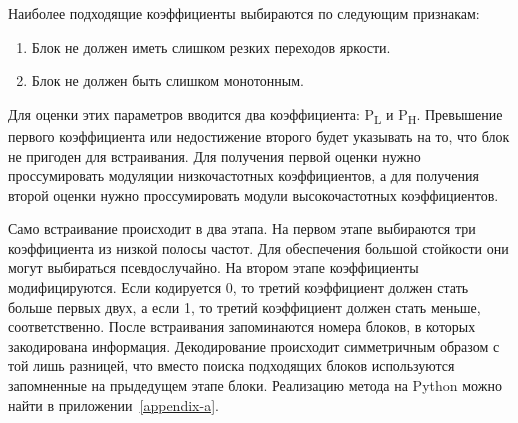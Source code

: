 Наиболее подходящие коэффициенты выбираются по следующим признакам:
\begin{enumerate}
    \item Блок не должен иметь слишком резких переходов яркости.
    \item Блок не должен быть слишком монотонным.
\end{enumerate}
Для оценки этих параметров вводится два коэффициента: P\textsubscript{L} и P\textsubscript{H}.
Превышение первого коэффициента или недостижение второго будет указывать на то,
что блок не пригоден для встраивания. Для получения первой оценки нужно проссумировать модуляции
низкочастотных коэффициентов, а для получения второй оценки нужно проссумировать модули высокочастотных
коэффициентов.

Само встраивание происходит в два этапа.
На первом этапе выбираются три коэффициента из низкой полосы частот.
Для обеспечения большой стойкости они могут выбираться псевдослучайно.
На втором этапе коэффициенты модифицируются. Если кодируется 0,
то третий коэффициент должен стать больше первых двух, а если 1,
то третий коэффициент должен стать меньше, соответственно.
После встраивания запоминаются номера блоков, в которых закодирована информация.
Декодирование происходит симметричным образом с той лишь разницей,
что вместо поиска подходящих блоков используются запомненные на прыдедущем этапе блоки.
Реализацию метода на Python можно найти в приложении~\ref{appendix-a}.